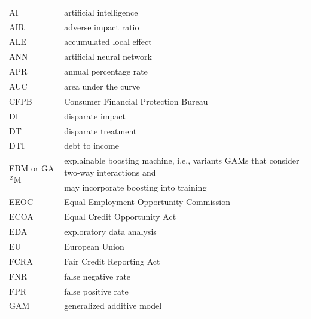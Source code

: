 \documentclass[information,article,accept,moreauthors,pdftex]{Definitions/mdpi}
\begin{document}
{{\noindent 
\begin{tabular}{@{}ll}
AI & artificial intelligence\\ 
AIR & adverse impact ratio\\ 
ALE & accumulated local effect\\ 
ANN & artificial neural network\\ %
APR & annual percentage rate\\ %
AUC & area under the curve\\ %
CFPB & Consumer Financial Protection Bureau\\%
DI & disparate impact\\ %
DT & disparate treatment\\%
DTI & debt to income\\ %
\multirow{2}{*}{EBM or GA$\textsuperscript{2}$M} & explainable boosting machine, i.e., variants GAMs that consider two-way interactions and \\ &may incorporate boosting into training\\%
EEOC & Equal Employment Opportunity Commission\\%
ECOA & Equal Credit Opportunity Act\\%
EDA & exploratory data analysis\\ %
EU & European Union\\ %
FCRA & Fair Credit Reporting Act\\ %
FNR & false negative rate\\ %
FPR & false positive rate\\ %
GAM & generalized additive model\\ %

\end{tabular}}}
\end{document}
